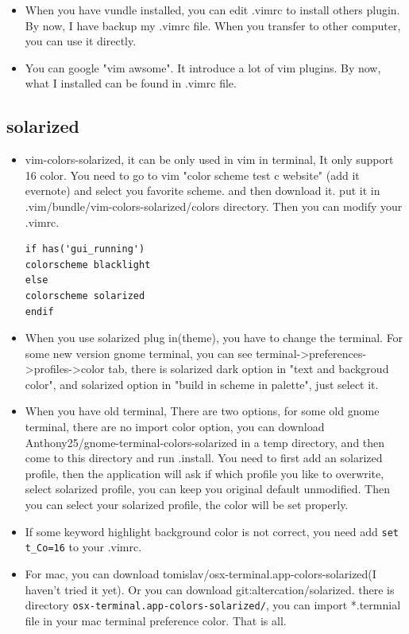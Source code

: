 \documentclass[a4paper,12pt,twoside]{book}
\begin{document}
\begin{itemize}
\begin{itemize}
\item When you have vundle installed, you can edit .vimrc to install others plugin. By now, I have backup my .vimrc file. When you transfer to other computer, you can use it directly. 
		\item You can google "vim awsome". It introduce a lot of vim plugins. By now, what I installed can be found in .vimrc file. 
		\end{itemize}

\subsection{solarized}
\begin{itemize}
	\item vim-colors-solarized, it can be only used in vim in terminal, It only support 16 color. You need to go to  vim "color scheme test c website" (add it evernote) and select you favorite scheme. and then download it. put it in .vim/bundle/vim-colors-solarized/colors directory. Then you can modify your .vimrc.
	
\begin{verbatim}
if has('gui_running')
colorscheme blacklight
else
colorscheme solarized
endif 
\end{verbatim}
	\item When you use solarized plug in(theme), you have to change the terminal. For some new version gnome terminal, you can see terminal->preferences->profiles->color tab, there is solarized dark option in "text and backgroud color", and solarized option in "build in scheme in palette", just select it.

    \item When you have old terminal, There are two options, for some old gnome
        terminal, there are no import color option, you can download
        Anthony25/gnome-terminal-colors-solarized in a temp directory, and then
        come to this directory and run .install. You need to first add an solarized profile, then the application will ask if which profile you like to overwrite, select solarized profile, you can keep you original default unmodified. Then you can select your solarized profile, the color will be set properly. 

\item If some keyword highlight background color is not correct, you need add \verb!set t_Co=16! to your .vimrc. 

		\item For mac, you can download
        tomislav/osx-terminal.app-colors-solarized(I haven't tried it yet). Or
        you can download git:altercation/solarized. there is directory \verb!osx-terminal.app-colors-solarized/!, you can import *.termnial file in
        your mac terminal preference color. That is all.
\end{itemize}


\end{itemize}
\end{document}

